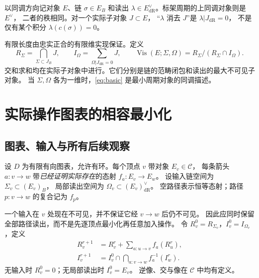 \documentclass[11pt,a4paper]{ctexart}
\theoremstyle{cnplain}
\theoremstyle{definition}
\theoremstyle{remark}
\newcommand{\dR}{\mathrm{dR}}
\newcommand{\Vis}{\operatorname{Vis}}
\begin{document}
以同调方向记对象 $E$、链 $\sigma\in E_B$ 和读出
$\lambda\in E_{\dR}^{\vee}$。标架周期的上同调对象则是 $E^\vee$，
二者的秩相同。对一个实际子对象 $J\subset E$，
``$\lambda$ 消去 $J$''是 $\lambda|J_{\dR}=0$，
不是仅有某个积分 $\lambda(c(\sigma))=0$。

有限长度由忠实正合的有限维实现保证。定义
\begin{equation}\label{eq:basic}
 R_\Sigma=\bigcap_{\Sigma\subset J_B}J,
 \qquad I_\Omega=\sum_{\Omega|J_{\dR}=0}J,
 \qquad \Vis(E;\Sigma,\Omega)=R_\Sigma/(R_\Sigma\cap I_\Omega).
\end{equation}
交和求和均在实际子对象中进行。它们分别是链的范畴闭包和读出的最大不可见子对象。
当 $\Sigma,\Omega$ 各为一维时，\eqref{eq:basic} 是最小周期对象的同调描述。

\section{实际操作图表的相容最小化}
\subsection{图表、输入与所有后续观察}
设 $D$ 为有限有向图表，允许有环。每个顶点 $v$ 带对象 $E_v\in\mathcal C$，
每条箭头 $a:v\to w$ 带\emph{已经证明实际存在}的态射 $f_a:E_v\to E_w$。
设输入链空间为 $\Sigma_v\subset(E_v)_B$，
局部读出空间为 $\Omega_v\subset(E_v)_{\dR}^{\vee}$。
空路径表示恒等态射；路径 $p:v\to w$ 的复合记为 $f_p$。

一个输入在 $v$ 处现在不可见，并不保证它经 $v\to w$ 后仍不可见。
因此应同时保留全部路径读出，而不是先逐顶点最小化再任意加入操作。
令 $R_v^0=R_{\Sigma_v}$，$I_v^0=I_{\Omega_v}$，定义
\begin{align}
 R_v^{r+1}&=R_v^r+\sum_{a:u\to v}f_a(R_u^r),\label{eq:Riter}\\
 I_v^{r+1}&=I_v^0\cap\bigcap_{a:v\to w}f_a^{-1}(I_w^r).
 \label{eq:Iiter}
\end{align}
无输入时 $R_v^0=0$；无局部读出时 $I_v^0=E_v$。
逆像、交与像在 $\mathcal C$ 中均有定义。
\end{document}
